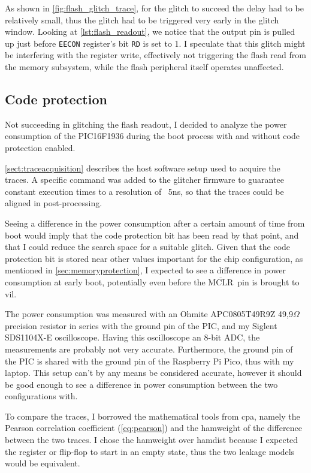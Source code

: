 \documentclass[a4paper,english,twoside,10pt]{article}
\newcommand{\mclr}{\(\overline{\mbox{MCLR}}\)\ }
\begin{document}
As shown in \autoref{fig:flash_glitch_trace}, for the glitch to succeed the delay had to be relatively small, thus the glitch had to be triggered very early in the glitch window. Looking at \autoref{lst:flash_readout}, we notice that the output pin is pulled up just before \texttt{EECON} register's bit \texttt{RD} is set to 1. I speculate that this glitch might be interfering with the register write, effectively not triggering the flash read from the memory subsystem, while the flash peripheral itself operates unaffected.

\subsection{Code protection}\label{sect:codeprotection}
Not succeeding in glitching the flash readout, I decided to analyze the power consumption of the PIC16F1936 during the boot process with and without code protection enabled.

\autoref{sect:traceacquisition} describes the host software setup used to acquire the traces. A specific command was added to the glitcher firmware to guarantee constant execution times to a resolution of ~5ns, so that the traces could be aligned in post-processing.

Seeing a difference in the power consumption after a certain amount of time from boot would imply that the code protection bit has been read by that point, and that I could reduce the search space for a suitable glitch. Given that the code protection bit is stored near other values important for the chip configuration, as mentioned in \autoref{sec:memoryprotection}, I expected to see a difference in power consumption at early boot, potentially even before the \mclr pin is brought to \gls{vil}.

The power consumption was measured with an Ohmite APC0805T49R9Z 49,9$\Omega$ precision resistor in series with the ground pin of the PIC, and my Siglent SDS1104X-E oscilloscope. Having this oscilloscope an 8-bit ADC, the measurements are probably not very accurate. Furthermore, the ground pin of the PIC is shared with the ground pin of the Raspberry Pi Pico, thus with my laptop. This setup can't by any means be considered accurate, however it should be good enough to see a difference in power consumption between the two configurations with.

To compare the traces, I borrowed the mathematical tools from \gls{cpa}, namely the Pearson correlation coefficient (\autoref{eq:pearson}) and the \gls{hamweight} of the difference between the two traces. I chose the \gls{hamweight} over \gls{hamdist} because I expected the register or flip-flop to start in an empty state, thus the two leakage models would be equivalent.
\end{document}
